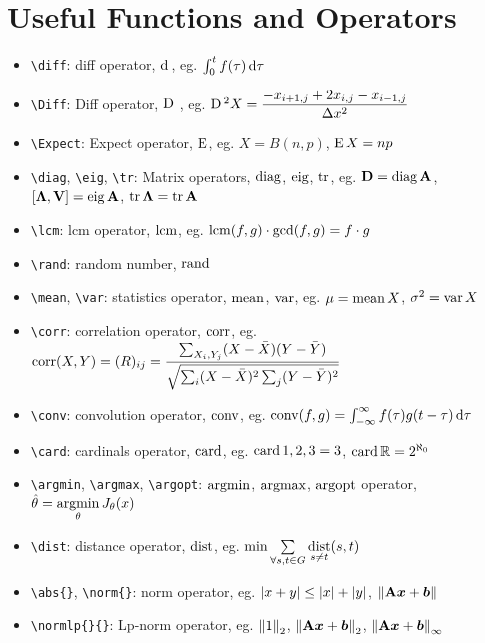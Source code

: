 \documentclass{article}
\begin{document}
\section{Useful Functions and Operators}
\begin{itemize}
\item \lstinline`\diff`: diff operator, $\operatorname{d\!}\ $, eg. $\int_0^t f(\tau) \operatorname{d\!} \tau$
\item \lstinline`\Diff`: Diff operator, $\operatorname{D}\ $, eg. $\operatorname{D}{}^2 X = \dfrac{-x_{i + 1, j} + 2x_{i, j} - x_{i - 1, j}}{\Delta x^2}$
\item \lstinline`\Expect`: Expect operator, $\operatorname{E}$, eg. $X = B(n, p)$, $\operatorname{E} X = np$
\item \lstinline`\diag`, \lstinline`\eig`, \lstinline`\tr`: Matrix operators, $\operatorname{diag}$, $\operatorname{eig}$, $\operatorname{tr}$, eg. ${\mathbf D} = \operatorname{diag} {\mathbf A}$, $[{\bm \Lambda}, {\mathbf V}] = \operatorname{eig} {\mathbf A}$, $\operatorname{tr} {\bm \Lambda} = \operatorname{tr} {\mathbf A}$
\item \lstinline`\lcm`: lcm operator, $\operatorname{lcm}$, eg. $\operatorname{lcm}(f, g) \cdot \gcd(f, g) = f \cdot g$
\item \lstinline`\rand`: random number, $\operatorname{rand}$
\item \lstinline`\mean`, \lstinline`\var`: statistics operator, $\operatorname{mean}$, $\operatorname{var}$, eg. $\mu = \operatorname{mean} X$, $\sigma^2 = \operatorname{var} X$
\item \lstinline`\corr`: correlation operator, $\operatorname{corr}$, eg. $\operatorname{corr}(X, Y) = (R)_{ij} = \dfrac{\sum_{X_i, Y_j}(X - \bar X)(Y - \bar Y)}{\sqrt{\sum_i(X - \bar X)^2\sum_j(Y - \bar Y)^2}}$
\item \lstinline`\conv`: convolution operator, $\operatorname{conv}$, eg. $\operatorname{conv}(f, g) = \int_{-\infty}^\infty f(\tau)g(t - \tau) \operatorname{d\!} \tau$
\item \lstinline`\card`: cardinals operator, $\operatorname{card}$, eg. $\operatorname{card} {1, 2, 3} = 3$, $\operatorname{card} {\mathbb R} = 2^{\aleph_0}$
\item \lstinline`\argmin`, \lstinline`\argmax`, \lstinline`\argopt`: $\operatorname*{argmin}$, $\operatorname*{argmax}$, $\operatorname*{argopt}$ operator, $\hat \theta = \operatorname*{argmin}\limits_\theta J_\theta(x)$
\item \lstinline`\dist`: distance operator, $\operatorname*{dist}$, eg. $\min \sum\limits_{\forall s, t \in G} \operatorname*{dist}\limits_{s \ne t} (s, t)$
\item \lstinline`\abs{}`, \lstinline`\norm{}`: norm operator, eg. ${\lvert {x+y} \rvert} \leq {\lvert {x} \rvert} + {\lvert {y} \rvert}$, ${\| {{\mathbf A} {\bm x} + {\bm b}} \|}$
\item \lstinline`\normlp{}{}`: Lp-norm operator, eg. ${{\| {1} \|}}_{2}$, ${{\| {{\mathbf A} {\bm x} + {\bm b}} \|}}_{2}$, ${{\| {{\mathbf A} {\bm x} + {\bm b}} \|}}_{\infty}$
\end{itemize}
\end{document}
